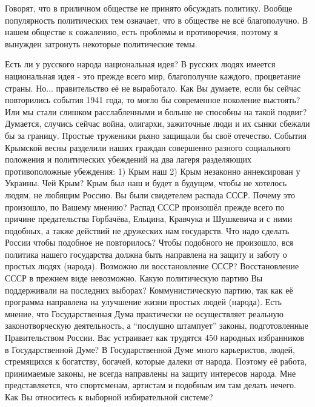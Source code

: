 \begin{drama}
	\maxspeaks Говорят, что в приличном обществе не принято обсуждать политику. Вообще популярность политических тем означает, что в обществе не всё благополучно. В нашем обществе к сожалению, есть проблемы и противоречия, поэтому я вынужден затронуть некоторые политические темы.
	
	Есть ли у русского народа национальная идея?
	\michaelspeaks В русских людях имеется национальная идея - это прежде всего мир, благополучие каждого, процветание страны. Но... правительство её не выработало.
	\maxspeaks Как Вы думаете, если бы сейчас повторились события 1941 года, то могло бы современное поколение выстоять? Или мы стали слишком расслабленными и больше не способны на такой подвиг?
	\michaelspeaks Думается, случись сейчас война, олигархи, зажиточные люди и их сынки сбежали бы за границу. Простые труженики рьяно защищали бы своё отечество.
	\maxspeaks События Крымской весны разделили наших граждан совершенно разного социального положения и политических убеждений на два лагеря разделяющих противоположные убеждения: 1) Крым наш 2) Крым незаконно аннексирован у Украины. Чей Крым?
	\michaelspeaks Крым был наш и будет в будущем, чтобы не хотелось людям, не любящим Россию.
	\maxspeaks Вы были свидетелем распада СССР. Почему это произошло, по Вашему мнению? 
	\michaelspeaks Распад СССР произошёл прежде всего по причине предательства Горбачёва, Ельцина, Кравчука и Шушкевича и с ними подобных, а также действий не дружеских нам государств.	
	\maxspeaks Что надо сделать России чтобы подобное не повторилось? 
	\michaelspeaks Чтобы подобного не произошло, вся политика нашего государства должна быть направлена на защиту и заботу о простых людях (народа).
	\maxspeaks Возможно ли восстановление СССР?
	\michaelspeaks Восстановление СССР в прежнем виде невозможно. 
	\maxspeaks Какую политическую партию Вы поддерживали на последних выборах? 
	\michaelspeaks Коммунистическую партию, так как её программа направлена на улучшение жизни простых людей (народа).
	\maxspeaks Есть мнение, что Государственная Дума практически не осуществляет реальную законотворческую деятельность, а “послушно штампует” законы, подготовленные Правительством России. Вас устраивает как трудятся 450 народных избранников в Государственной Думе? 
	\michaelspeaks В Государственной Думе много карьеристов, людей, стремящихся к богатству, богачей, которые далеки от народа. Поэтому её работа, принимаемые законы, не всегда направлены на защиту интересов народа. Мне представляется, что спортсменам, артистам и подобным им там делать нечего.
	\maxspeaks Как Вы относитесь к выборной избирательной системе? 

\end{drama}
